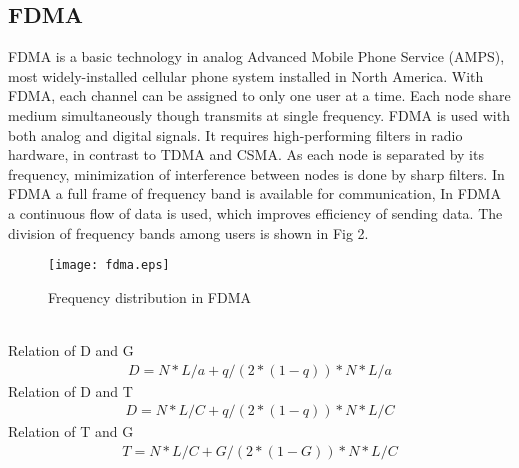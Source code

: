 \documentclass[10pt, conference, compsocconf]{IEEEtran}
\begin{document}
\subsection{FDMA}
FDMA is a basic technology in analog Advanced Mobile Phone Service (AMPS), most widely-installed cellular phone system installed in North America. With FDMA, each channel can be assigned to only one user at a time.
Each node share medium simultaneously though transmits at single frequency. FDMA is used with both analog and digital signals. It requires high-performing filters in radio hardware, in contrast to TDMA and CSMA. As each node is separated by its frequency, minimization of interference between nodes is done by sharp filters. In FDMA a full frame of frequency band is available for communication, In FDMA a continuous flow of data is used, which improves efficiency of sending data. The division of frequency bands among users is shown in Fig 2.
\begin{figure}[!h]
\centering
\caption{Frequency distribution in FDMA}
\texttt{[image: fdma.eps]}
\end{figure}
\\Relation of D and G
\begin{eqnarray}
D=N*L/a+q/(2*(1-q))*N*L/a
\end{eqnarray}
Relation of D and T
\begin{eqnarray}
D=N*L/C+q/(2*(1-q))*N*L/C
\end{eqnarray}
Relation of T and G
\begin{eqnarray}
T=N*L/C+G/(2*(1-G))*N*L/C
\end{eqnarray}
\end{document}
